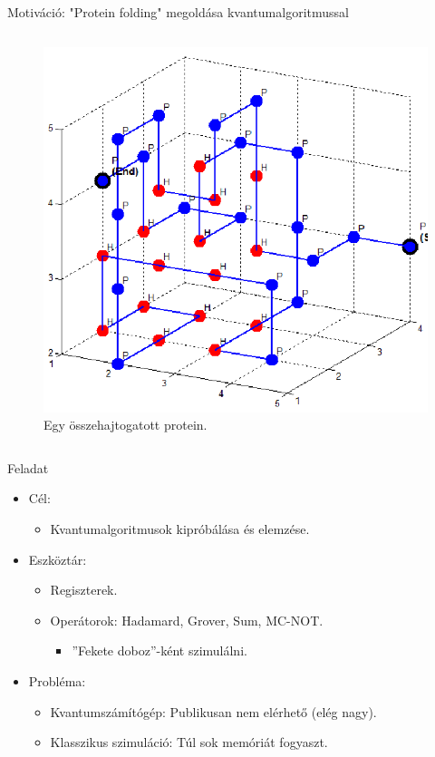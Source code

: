 \documentclass[aspectratio=169]{beamer}
\begin{document}
\begin{frame}{Motiváció: "Protein folding" megoldása kvantumalgoritmussal}
\begin{columns}
\begin{column}{0.45\textwidth}
\begin{figure}[H]
\center
\includegraphics[width=\textwidth]{./figures/Protein-folds-with-length-36-amino-acids-18-contacts.png}
\caption{Egy összehajtogatott protein.}
\end{figure}
\end{column}
\end{columns}

\end{frame}

\begin{frame}[t]{Feladat}

\begin{itemize}
    \item Cél:
    \begin{itemize}
      \item Kvantumalgoritmusok kipróbálása és elemzése.
    \end{itemize}
    \item Eszköztár: 
    \begin{itemize}
      \item Regiszterek.
      \item Operátorok: Hadamard, Grover, Sum, MC-NOT.
      \begin{itemize}
        \item ''Fekete doboz''-ként szimulálni.
      \end{itemize}
    \end{itemize}
    \item Probléma:
    \begin{itemize}
      \item Kvantumszámítógép: Publikusan nem elérhető (elég nagy).
      \item Klasszikus szimuláció: Túl sok memóriát fogyaszt.
    \end{itemize}
\end{itemize}
\end{frame}
\end{document}
